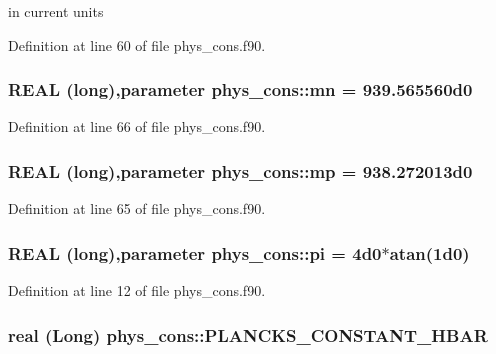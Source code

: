 in current units 



Definition at line 60 of file phys\_\-cons.f90.

\hypertarget{namespacephys__cons_ad68aaba74b75e1e13f1367c1eb0904c1}{
\subsubsection[{mn}]{\setlength{\rightskip}{0pt plus 5cm}REAL (long),parameter {\bf phys\_\-cons::mn} = 939.565560d0}}
\label{namespacephys__cons_ad68aaba74b75e1e13f1367c1eb0904c1}


Definition at line 66 of file phys\_\-cons.f90.

\hypertarget{namespacephys__cons_ae2a4cb4e421fe399f19d0729b5617fed}{
\subsubsection[{mp}]{\setlength{\rightskip}{0pt plus 5cm}REAL (long),parameter {\bf phys\_\-cons::mp} = 938.272013d0}}
\label{namespacephys__cons_ae2a4cb4e421fe399f19d0729b5617fed}


Definition at line 65 of file phys\_\-cons.f90.

\hypertarget{namespacephys__cons_aae3c6cb8ae765b0262bb110ff739ba9d}{
\subsubsection[{pi}]{\setlength{\rightskip}{0pt plus 5cm}REAL (long),parameter {\bf phys\_\-cons::pi} = 4d0$\ast$atan(1d0)}}
\label{namespacephys__cons_aae3c6cb8ae765b0262bb110ff739ba9d}


Definition at line 12 of file phys\_\-cons.f90.

\hypertarget{namespacephys__cons_af0b754235993060b14fc81b7d1f702a5}{
\subsubsection[{PLANCKS\_\-CONSTANT\_\-HBAR}]{\setlength{\rightskip}{0pt plus 5cm}real (Long) {\bf phys\_\-cons::PLANCKS\_\-CONSTANT\_\-HBAR}}}
\label{namespacephys__cons_af0b754235993060b14fc81b7d1f702a5}


